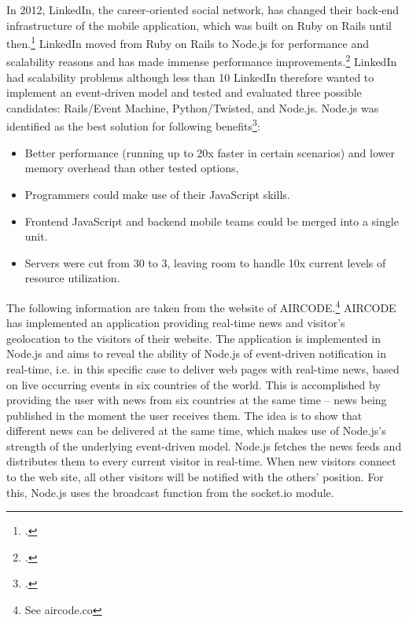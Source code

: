 \begin{appendices}
\begin{subappendices}
\label{app:case_linkedin}
In 2012, LinkedIn, the career-oriented social network, has changed their back-end infrastructure of the mobile application, which was built on Ruby on Rails until then.\footcite[Cf.][]{Avram_2012} LinkedIn moved from Ruby on Rails to Node.js for performance and scalability reasons and has made immense performance improvements.\footcite[Cf.][]{ODell_2011} 
LinkedIn had scalability problems although less than 10%
LinkedIn therefore wanted to implement an event-driven model and tested and evaluated three possible candidates: Rails/Event Machine, Python/Twisted, and Node.js.
Node.js was identified as the best solution for following benefits\footcite[Cf.][]{Avram_2012}:
\begin{itemize}
  \item Better performance (running up to 20x faster in certain scenarios) and lower memory overhead than other tested options, 
  \item Programmers could make use of their JavaScript skills. 
  \item Frontend JavaScript and backend mobile teams could be merged into a single unit. 
  \item Servers were cut from 30 to 3, leaving room to handle 10x current levels of resource utilization.
\end{itemize}

\label{app:case_aircode}

The following information are taken from the website of AIRCODE.\footnote{See aircode.co}
AIRCODE has implemented an application providing real-time news and visitor’s geolocation to the visitors of their website. The application is implemented in Node.js and aims to reveal the ability of Node.js of event-driven notification in real-time, i.e. in this specific case to deliver web pages with real-time news, based on live occurring events in six countries of the world. This is accomplished by providing the user with news from six countries at the same time – news being published in the moment the user receives them. The idea is to show that different news can be delivered at the same time, which makes use of Node.js’s strength of the underlying event-driven model.
Node.js fetches the news feeds and distributes them to every current visitor in real-time. When new visitors connect to the web site, all other visitors will be notified with the others’ position. For this, Node.js uses the broadcast function from the socket.io module.


\end{subappendices}
\end{appendices}
